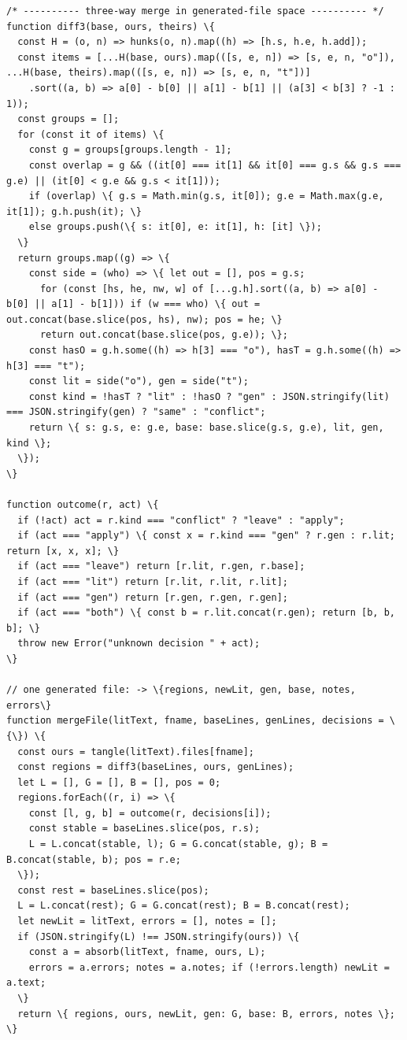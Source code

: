 \documentclass[10pt,a4paper]{article}
\begin{document}
\begin{Verbatim}
/* ---------- three-way merge in generated-file space ---------- */
function diff3(base, ours, theirs) \{
  const H = (o, n) => hunks(o, n).map((h) => [h.s, h.e, h.add]);
  const items = [...H(base, ours).map(([s, e, n]) => [s, e, n, "o"]), ...H(base, theirs).map(([s, e, n]) => [s, e, n, "t"])]
    .sort((a, b) => a[0] - b[0] || a[1] - b[1] || (a[3] < b[3] ? -1 : 1));
  const groups = [];
  for (const it of items) \{
    const g = groups[groups.length - 1];
    const overlap = g && ((it[0] === it[1] && it[0] === g.s && g.s === g.e) || (it[0] < g.e && g.s < it[1]));
    if (overlap) \{ g.s = Math.min(g.s, it[0]); g.e = Math.max(g.e, it[1]); g.h.push(it); \}
    else groups.push(\{ s: it[0], e: it[1], h: [it] \});
  \}
  return groups.map((g) => \{
    const side = (who) => \{ let out = [], pos = g.s;
      for (const [hs, he, nw, w] of [...g.h].sort((a, b) => a[0] - b[0] || a[1] - b[1])) if (w === who) \{ out = out.concat(base.slice(pos, hs), nw); pos = he; \}
      return out.concat(base.slice(pos, g.e)); \};
    const hasO = g.h.some((h) => h[3] === "o"), hasT = g.h.some((h) => h[3] === "t");
    const lit = side("o"), gen = side("t");
    const kind = !hasT ? "lit" : !hasO ? "gen" : JSON.stringify(lit) === JSON.stringify(gen) ? "same" : "conflict";
    return \{ s: g.s, e: g.e, base: base.slice(g.s, g.e), lit, gen, kind \};
  \});
\}

function outcome(r, act) \{
  if (!act) act = r.kind === "conflict" ? "leave" : "apply";
  if (act === "apply") \{ const x = r.kind === "gen" ? r.gen : r.lit; return [x, x, x]; \}
  if (act === "leave") return [r.lit, r.gen, r.base];
  if (act === "lit") return [r.lit, r.lit, r.lit];
  if (act === "gen") return [r.gen, r.gen, r.gen];
  if (act === "both") \{ const b = r.lit.concat(r.gen); return [b, b, b]; \}
  throw new Error("unknown decision " + act);
\}

// one generated file: -> \{regions, newLit, gen, base, notes, errors\}
function mergeFile(litText, fname, baseLines, genLines, decisions = \{\}) \{
  const ours = tangle(litText).files[fname];
  const regions = diff3(baseLines, ours, genLines);
  let L = [], G = [], B = [], pos = 0;
  regions.forEach((r, i) => \{
    const [l, g, b] = outcome(r, decisions[i]);
    const stable = baseLines.slice(pos, r.s);
    L = L.concat(stable, l); G = G.concat(stable, g); B = B.concat(stable, b); pos = r.e;
  \});
  const rest = baseLines.slice(pos);
  L = L.concat(rest); G = G.concat(rest); B = B.concat(rest);
  let newLit = litText, errors = [], notes = [];
  if (JSON.stringify(L) !== JSON.stringify(ours)) \{
    const a = absorb(litText, fname, ours, L);
    errors = a.errors; notes = a.notes; if (!errors.length) newLit = a.text;
  \}
  return \{ regions, ours, newLit, gen: G, base: B, errors, notes \};
\}
\end{Verbatim}
\end{document}

